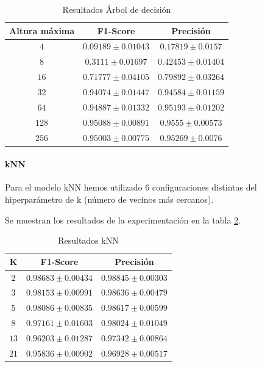 \documentclass[12pt]{article}
\begin{document}
\begin{table}[!ht]
	\caption{Resultados Árbol de decisión}
	\centering
		 \begin{tabular}{||c c c||}
			 \hline
			 Altura máxima & F1-Score & Precisión  \\ [0.5ex]
			 \hline\hline
			 $4$ & $0.09189 \pm 0.01043$ & $0.17819 \pm 0.0157$ \\
			\hline
			$8$ & $0.3111 \pm 0.01697$ & $0.42453 \pm 0.01404$ \\
			\hline
			$16$ & $0.71777 \pm 0.04105$ & $0.79892 \pm 0.03264$ \\
			\hline
			$32$ & $0.94074 \pm 0.01447$ & $0.94584 \pm 0.01159$ \\
			\hline
			$64$ & $0.94887 \pm 0.01332$ & $0.95193 \pm 0.01202$ \\
			\hline
			$128$ & $0.95088 \pm 0.00891$ & $0.9555 \pm 0.00573$ \\
			\hline
			$256$ & $0.95003 \pm 0.00775$ & $0.95269 \pm 0.0076$ \\
			\hline
		 \end{tabular}
	\label{Tab:DecisionTree_3}
	\end{table}

\paragraph{kNN}
Para el modelo kNN hemos utilizado 6 configuraciones distintas del hiperparámetro de k (número de vecinos más cercanos).

Se muestran los resultados de la experimentación en la tabla \ref{Tab:kNN_3}.

\begin{table}[!ht]
	\caption{Resultados kNN}
	\centering
		 \begin{tabular}{||c c c||}
			 \hline
			 K & F1-Score & Precisión  \\ [0.5ex]
			 \hline\hline
			 $2$ & $0.98683 \pm 0.00434$ & $0.98845 \pm 0.00303$ \\
			\hline
			$3$ & $0.98153 \pm 0.00991$ & $0.98636 \pm 0.00479$ \\
			\hline
			$5$ & $0.98086 \pm 0.00835$ & $0.98617 \pm 0.00599$ \\
			\hline
			$8$ & $0.97161 \pm 0.01603$ & $0.98024 \pm 0.01049$ \\
			\hline
			$13$ & $0.96203 \pm 0.01287$ & $0.97342 \pm 0.00864$ \\
			\hline
			$21$ & $0.95836 \pm 0.00902$ & $0.96928 \pm 0.00517$ \\
			\hline
		 \end{tabular}
	\label{Tab:kNN_3}
\end{table}
\end{document}
